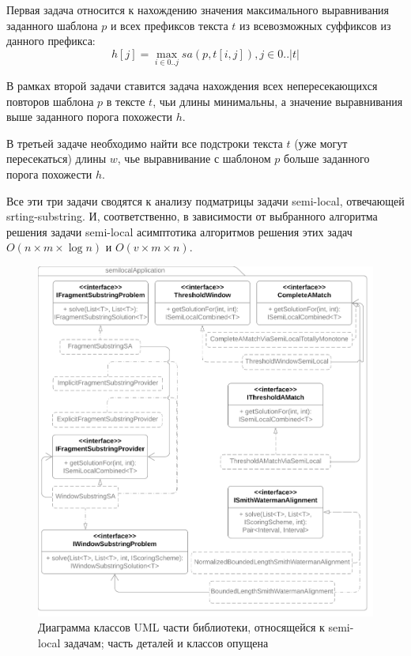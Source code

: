 Первая задача относится к нахождению значения максимального выравнивания заданного шаблона $p$ и всех префиксов текста $t$ из всевозможных суффиксов из данного префикса:
\begin{equation}
    h[j] = \max _{i \in 0 ..j} sa(p,t[i,j]), j \in 0..|t|
\end{equation}

В рамках второй задачи ставится задача нахождения всех непересекающихся повторов шаблона $p$ в тексте $t$, чьи длины минимальны, а значение выравнивания выше заданного порога похожести $h$.

В третьей задаче необходимо найти все подстроки текста $t$ (уже могут пересекаться) длины $w$, чье выравнивание с шаблоном $p$ больше заданного порога похожести $h$.

Все эти три задачи сводятся к анализу {подматрицы} задачи 
{semi-local}, отвечающей {srting-substring}.
И, соответственно, в зависимости от выбранного алгоритма решения задачи {semi-local} асимптотика алгоритмов решения этих задач $O(n \times m \times \log n)$ и $O(v \times  m \times n)$.


\begin{figure}
    \includegraphics[width=\columnwidth]{Mishin/figures/semiLocalApplication.png}
    \caption{Диаграмма классов UML части библиотеки, относящейся к {semi-local} задачам; часть деталей и классов опущена}\label{fig:libraryApplication}
\end{figure}


